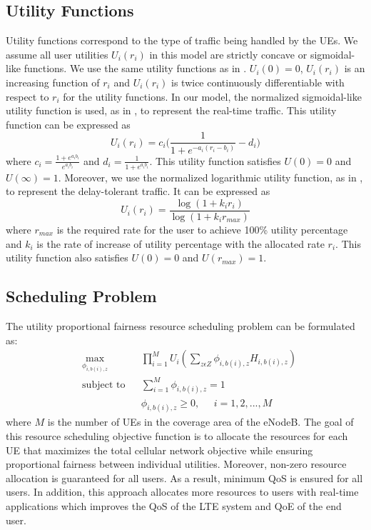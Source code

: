\documentclass[journal]{IEEEtran} 				\IEEEoverridecommandlockouts 	\usepackage{amsmath,amssymb}
\begin{document}
\subsection{Utility Functions}\label{sec:utilities}

Utility functions correspond to the type of traffic being handled by the UEs. We assume all user utilities $U_i(r_i)$ in this model are strictly concave or sigmoidal-like functions. We use the same utility functions as in \cite{Ahmed_Utility1}. $U_i(0) = 0$, $U_i(r_i)$ is an increasing function of $r_i$ and $U_i(r_i)$ is twice continuously differentiable with respect to $r_i$ for the utility functions.
In our model, the normalized sigmoidal-like utility function is used, as in \cite{DL_PowerAllocation}, to represent the real-time traffic. This utility function can be expressed as 
\begin{equation}\label{eqn:sigmoid}
U_i(r_i) = c_i\Big(\frac{1}{1+e^{-a_i(r_i-b_i)}}-d_i\Big)
\end{equation}
where $c_i = \frac{1+e^{a_ib_i}}{e^{a_ib_i}}$ and $d_i = \frac{1}{1+e^{a_ib_i}}$. This utility function satisfies $U(0)=0$ and $U(\infty)=1$. Moreover, we use the normalized logarithmic utility function, as in \cite{UtilityFairness}, to represent the delay-tolerant traffic. It can be expressed as 
\begin{equation}\label{eqn:log}
U_i(r_i) = \frac{\log(1+k_ir_i)}{\log(1+k_i r_{max})}
\end{equation}
where $r_{max}$ is the required rate for the user to achieve 100\% utility percentage and $k_i$ is the rate of increase of utility percentage with the allocated rate $r_i$. This utility function also satisfies $U(0)=0$ and $U(r_{max})=1$. 
 


\subsection{Scheduling Problem}\label{sec:scheduling}
The utility proportional fairness resource scheduling problem can be formulated as:
\begin{equation}\label{eqn:opt_prob_fairness}
\begin{aligned}
& \underset{\textbf{$\phi_{i,b(i),z}$}} {\text{max}}
& & \prod_{i=1}^{M}U_i(\sum_{z\epsilon Z}\phi_{i,b(i),z} H_{i,b(i),z}) \\
& \text{subject to}
& & \sum_{i=1}^{M}\phi_{i,b(i),z} =1\\
& & &  \phi_{i,b(i),z} \geq 0, \;\;\;\;\; i = 1,2, ...,M
\end{aligned}
\end{equation}
where $M$ is the number of UEs in the coverage area of the eNodeB. The goal of this resource scheduling objective function is to allocate the resources for each UE that maximizes the total cellular network objective while ensuring proportional fairness between individual utilities. Moreover, non-zero resource allocation is guaranteed for all users. As a result, minimum QoS is ensured for all users. In addition, this approach allocates more resources to users with real-time applications which improves the QoS of the LTE system and QoE of the end user. 
\end{document}
